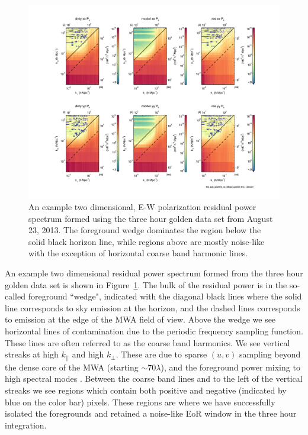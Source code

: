 \documentclass[iop]{emulateapj}
\begin{document}
\begin{figure}
\begin{center}
\includegraphics[width=\columnwidth]{example_ps.pdf}
\caption{
An example two dimensional, E-W polarization residual power spectrum formed using the 
three hour golden data set
from August 23, 2013. The foreground wedge dominates the region below the solid 
black horizon line, while regions above are mostly noise-like with the exception of horizontal 
coarse band harmonic lines. 
\label{fig:example_ps}
}
\end{center}
\end{figure}

An example two dimensional residual power spectrum formed from the three hour golden 
data set is shown in Figure~\ref{fig:example_ps}. The bulk of the residual power is in the 
so-called foreground ``wedge", indicated with the diagonal black lines where the solid line 
corresponds to sky emission at the horizon, and the dashed lines corresponds to emission 
at the edge of the MWA field of view. Above the wedge we see horizontal lines of 
contamination due to the periodic frequency sampling function. These lines are often 
referred to as the coarse band harmonics. We see vertical streaks at high $k_{||}$ and high 
$k_{\perp}$. These are due to sparse $(u,v)$ sampling beyond the dense core of the MWA 
(starting $\sim70\lambda$), and the foreground power mixing to high spectral 
modes \citep{Bowman:2009}. Between the coarse band lines and to the left of the vertical streaks we see regions 
which contain both positive and negative (indicated by blue on the color bar) pixels. These 
regions are where we have successfully isolated the foregrounds and retained a noise-like 
EoR window in the three hour integration.
\end{document}

